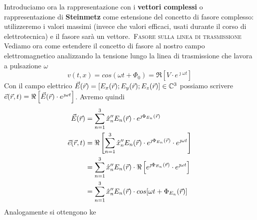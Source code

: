 Introduciamo ora la rappresentazione con i \textbf{vettori complessi} o rappresentazione di \textbf{Steinmetz}
come estensione del concetto di fasore complesso: utilizzeremo i valori massimi (invece che valori efficaci,
usati durante il corso di elettrotecnica) e il fasore sarà un vettore.\
\textsc{Fasore sulla linea di trasmissione}\\
Vediamo ora come estendere il concetto di fasore al nostro campo elettromagnetico analizzando
la tensione lungo la linea di trasmissione che lavora a pulsazione $\omega$
\begin{equation}
  v(t,x) = cos(\omega t + \Phi_0) = \Re\left[V \cdot e^{\jmath \omega t}\right]
\end{equation}
Con il campo elettrico $\vec{E}(\vec{r}) = \left[E_x(\vec{r});E_y(\vec{r});E_z(\vec{r})\right] \in \mathbb{C}^3$ possiamo
scrivere $\vec{e}(\vec{r},t) = \Re\left[\vec{E}(\vec{r})\cdot e^{\jmath \omega t}\right]$. Avremo quindi
\begin{equation}\begin{split}
  \vec{E}(\vec{r}) &= \sum\limits_{n=1}^3 \hat{x}_n^{\prime\prime} E_n(\vec{r})\cdot e^{\jmath \Phi_{E_n}(\vec{r})} \\
  \vec{e}(\vec{r},t) &= \Re\left[\sum\limits_{n=1}^3 \hat{x}_n^{\prime\prime} E_n(\vec{r})\cdot e^{\jmath \Phi_{E_n}(\vec{r})}\cdot e^{\jmath \omega t}\right]\\
  &=\sum\limits_{n=1}^3 \hat{x}_n^{\prime\prime} E_n(\vec{r})\cdot \Re\left[e^{\jmath \Phi_{E_n}(\vec{r})}\cdot e^{\jmath \omega t}\right]\\
  &=\sum\limits_{n=1}^3 \hat{x}_n^{\prime\prime} E_n(\vec{r})\cdot cos[\omega t + \Phi_{E_n}(\vec{r})]
\end{split}\end{equation}
Analogamente si ottengono ke
